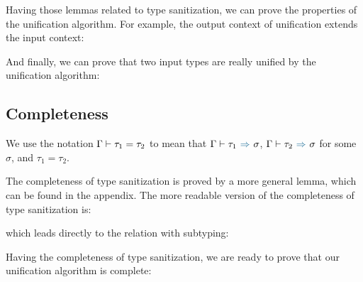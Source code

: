 \begin{lemma}[\TypeSanitizationWellFormednessName]
  \TypeSanitizationWellFormednessBody
\end{lemma}

Having those lemmas related to type sanitization, we can prove the properties of
the unification algorithm. For example, the output context of unification
extends the input context:

\begin{lemma}[\UnificationExtensionName]\leavevmode
  \UnificationExtensionBody
\end{lemma}

And finally, we can prove that two input types are really unified by the
unification algorithm:

\begin{lemma}[\UnificationEquivalenceName]\leavevmode
  \UnificationEquivalenceBody
\end{lemma}

\subsection{Completeness}

We use the notation $\Gamma \vdash \tau_1 = \tau_2$ to mean that
$\tctx \byinf \tau_1 \infto \sigma$, $\tctx \byinf \tau_2 \infto \sigma$ for
some $\sigma$,
and $\tau_1 = \tau_2$.

The completeness of type sanitization is proved by a more general lemma, which
can be found in the appendix. The more readable version of the completeness of
type sanitization is:

\begin{corollary}[\TypeSanitizationCompletenessPrettyName]
  \label{lemma:\TypeSanitizationCompletenessPrettyName}
  \TypeSanitizationCompletenessPrettyBody
\end{corollary}

\noindent which leads directly to the relation with subtyping:

\begin{lemma}[\TypeSanitizationCompletenessUnificationName]\leavevmode
  \label{lemma:\TypeSanitizationCompletenessUnificationName}
  \TypeSanitizationCompletenessUnificationBody
\end{lemma}

Having the completeness of type sanitization, we are ready to prove that our
unification algorithm is complete:

\begin{lemma}[\UnificationCompletenessName]
  \label{lemma:\UnificationCompletenessName}
    \UnificationCompletenessBody
\end{lemma}
